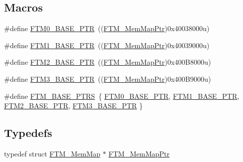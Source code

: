 \subsection*{Macros}
\begin{DoxyCompactItemize}
\item 
\#define \hyperlink{group___f_t_m___peripheral_gae712c29b7abcf338d8f8f6418683fa66}{F\+T\+M0\+\_\+\+B\+A\+S\+E\+\_\+\+P\+T\+R}~((\hyperlink{group___f_t_m___peripheral_gaafa7875c9deb2b3afe4aa22ce6a99d39}{F\+T\+M\+\_\+\+Mem\+Map\+Ptr})0x40038000u)
\item 
\#define \hyperlink{group___f_t_m___peripheral_ga38115fba8eadfc94b2fc411f45906002}{F\+T\+M1\+\_\+\+B\+A\+S\+E\+\_\+\+P\+T\+R}~((\hyperlink{group___f_t_m___peripheral_gaafa7875c9deb2b3afe4aa22ce6a99d39}{F\+T\+M\+\_\+\+Mem\+Map\+Ptr})0x40039000u)
\item 
\#define \hyperlink{group___f_t_m___peripheral_ga897564efeaf1be1f991305d294eda3d6}{F\+T\+M2\+\_\+\+B\+A\+S\+E\+\_\+\+P\+T\+R}~((\hyperlink{group___f_t_m___peripheral_gaafa7875c9deb2b3afe4aa22ce6a99d39}{F\+T\+M\+\_\+\+Mem\+Map\+Ptr})0x400\+B8000u)
\item 
\#define \hyperlink{group___f_t_m___peripheral_ga32dd0c357080d5680c0c5b3cf821adab}{F\+T\+M3\+\_\+\+B\+A\+S\+E\+\_\+\+P\+T\+R}~((\hyperlink{group___f_t_m___peripheral_gaafa7875c9deb2b3afe4aa22ce6a99d39}{F\+T\+M\+\_\+\+Mem\+Map\+Ptr})0x400\+B9000u)
\item 
\#define \hyperlink{group___f_t_m___peripheral_ga1a5a7cb39d1713239478a1ebce2f05cc}{F\+T\+M\+\_\+\+B\+A\+S\+E\+\_\+\+P\+T\+R\+S}~\{ \hyperlink{group___f_t_m___peripheral_gae712c29b7abcf338d8f8f6418683fa66}{F\+T\+M0\+\_\+\+B\+A\+S\+E\+\_\+\+P\+T\+R}, \hyperlink{group___f_t_m___peripheral_ga38115fba8eadfc94b2fc411f45906002}{F\+T\+M1\+\_\+\+B\+A\+S\+E\+\_\+\+P\+T\+R}, \hyperlink{group___f_t_m___peripheral_ga897564efeaf1be1f991305d294eda3d6}{F\+T\+M2\+\_\+\+B\+A\+S\+E\+\_\+\+P\+T\+R}, \hyperlink{group___f_t_m___peripheral_ga32dd0c357080d5680c0c5b3cf821adab}{F\+T\+M3\+\_\+\+B\+A\+S\+E\+\_\+\+P\+T\+R} \}
\end{DoxyCompactItemize}
\subsection*{Typedefs}
\begin{DoxyCompactItemize}
\item 
typedef struct \hyperlink{struct_f_t_m___mem_map}{F\+T\+M\+\_\+\+Mem\+Map} $\ast$ \hyperlink{group___f_t_m___peripheral_gaafa7875c9deb2b3afe4aa22ce6a99d39}{F\+T\+M\+\_\+\+Mem\+Map\+Ptr}
\end{DoxyCompactItemize}


